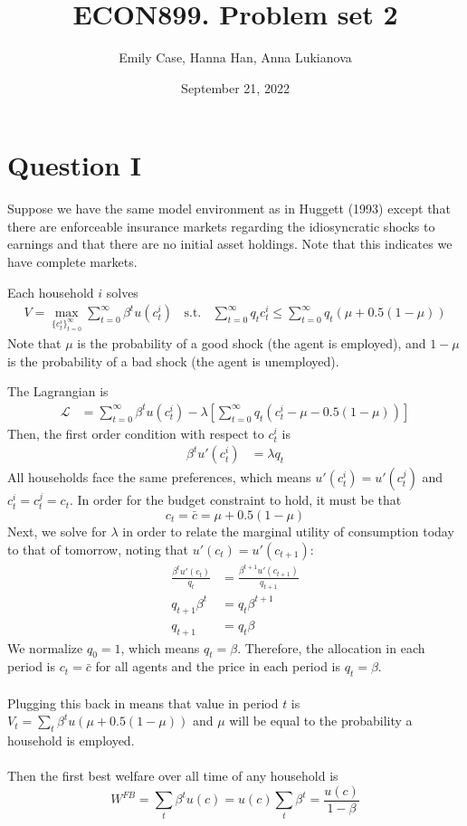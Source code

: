 \documentclass[12pt]{article}
\title{ECON899. 
Problem set 2}
\author{Emily Case, Hanna Han, Anna Lukianova}
\date{September 21, 2022}
\begin{document}
    \maketitle
    
\section*{Question I}
Suppose we have the same model environment as in Huggett (1993) except that there are enforceable insurance markets regarding the idiosyncratic shocks to earnings and that there are no initial asset holdings. Note that this indicates we have complete markets.

Each household $i$ solves
\begin{align*}
    V = \max_{\{c_t^i\}_{t=0}^\infty} \sum_{t = 0}^\infty \beta^t u(c_t^i) \;\; \text{ s.t. } \;\; \sum_{t=0}^{\infty} q_t c_t^i \leq \sum_{t=0}^{\infty} q_t ( \mu + 0.5(1-\mu)) 
\end{align*}
Note that $\mu$ is the probability of a good shock (the agent is employed), and $1-\mu$ is the probability of a bad shock (the agent is unemployed).

The Lagrangian is 
\begin{align*}
    \mathcal{L} & =\sum_{t = 0}^\infty \beta^t u(c_t^i) - \lambda \left[ \sum_{t=0}^{\infty} q_t (c_t^i - \mu - 0.5(1-\mu)) \right]
\end{align*}
Then, the first order condition with respect to $c_t^i$ is 
\begin{align*}
    \beta^t u'(c_t^i) & = \lambda q_t 
\end{align*}
All households face the same preferences, which means $u'(c_t^i) = u'(c_t^j)$ and $c_t^i = c_t^j = c_t$. In order for the budget constraint to hold, it must be that
\[ c_t = \bar{c} = \mu + 0.5(1-\mu)\]
Next, we solve for $\lambda$ in order to relate the marginal utility of consumption today to that of tomorrow, noting that $u'(c_{t}) = u'(c_{t+1})$:
\begin{align*}
    \frac{\beta^t u'(c_t)}{q_t} & = \frac{\beta^{t+1}u'(c_{t+1})}{q_{t+1}} \\
    q_{t+1} \beta^t & = q_t \beta^{t+1} \\
    q_{t+1} & = q_t \beta 
\end{align*}
We normalize $q_0 = 1$, which means $q_t = \beta$. Therefore, the allocation in each period is $c_t = \bar{c}$ for all agents and the price in each period is $q_t = \beta$.
\\
\\
Plugging this back in means that value in period $t$ is $ V_t  = \sum_{t} \beta^t u(\mu + 0.5(1-\mu)) $ and $\mu$ will be equal to the probability a household is employed.
\\
\\
Then the first best welfare over all time of any household is 
\[ W^{FB} = \sum_t \beta^t u(c) = u(c) \sum_t \beta^t = \frac{u(c)}{1-\beta}\]
%
\end{document}
